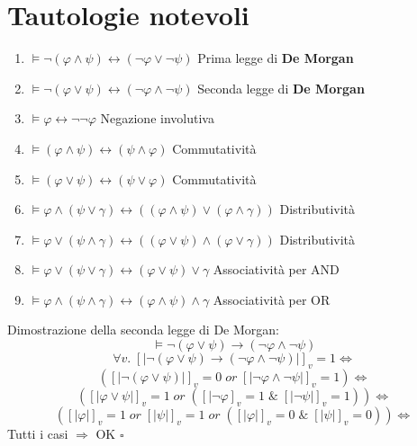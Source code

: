 \documentclass{article}
\theoremstyle{break}
\theoremstyle{break}
\theoremstyle{break}
\theoremstyle{break}
\begin{document}
\section{Tautologie notevoli}
\begin{enumerate}
    \item \( \models \neg (\varphi \wedge \psi) \leftrightarrow (\neg \varphi \vee \neg \psi) \) Prima legge di \textbf{De Morgan}
    \item \( \models \neg (\varphi \vee \psi) \leftrightarrow (\neg \varphi \wedge \neg \psi) \) Seconda legge di \textbf{De Morgan}
    \item \( \models \varphi \leftrightarrow \neg \neg \varphi \) Negazione involutiva
    \item \( \models (\varphi \wedge \psi) \leftrightarrow (\psi \wedge \varphi) \)  Commutatività
    \item \( \models (\varphi \vee \psi) \leftrightarrow (\psi \vee \varphi) \) Commutatività
    \item \( \models \varphi \wedge (\psi \vee \gamma) \leftrightarrow ((\varphi \wedge \psi) \vee (\varphi \wedge \gamma)) \) Distributività
    \item \( \models \varphi \vee (\psi \wedge \gamma) \leftrightarrow ((\varphi \vee \psi) \wedge (\varphi \vee \gamma)) \) Distributività
    \item \( \models \varphi \vee (\psi \vee \gamma) \leftrightarrow (\varphi \vee \psi) \vee \gamma \) Associatività per AND
    \item \( \models \varphi \wedge (\psi \wedge \gamma) \leftrightarrow (\varphi \wedge \psi) \wedge \gamma \) Associatività per OR
\end{enumerate}

\begin{exercise}
    Dimostrazione della seconda legge di De Morgan:
    \[
    \models \neg (\varphi \vee \psi) \to (\neg \varphi \wedge \neg \psi)
    \] 
    \[
        \forall v.\; [|\neg(\varphi \vee \psi) \to (\neg \varphi \wedge \neg \psi)|]_v=1 \Leftrightarrow
    \] 
    \[
        ([|\neg (\varphi \vee \psi)|]_v=0\; or\; [|\neg \varphi \wedge \neg \psi|]_v=1) \Leftrightarrow
    \] 
    \[
        ([|\varphi \vee \psi|]_v = 1 \;or\; ([|\neg \varphi]_v=1\; \&\; [|\neg \psi|]_v=1)) \Leftrightarrow
    \] 
    \[
        ([|\varphi|]_v=1\;or\;[|\psi|]_v=1\;or\;( [|\varphi|]_v=0\; \&\; [|\psi|]_v=0)) \Leftrightarrow
    \] 
    Tutti i casi \( \Rightarrow \) OK \( \square \)  
\end{exercise}
\end{document}
